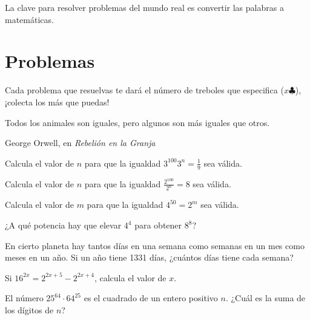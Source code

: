 \begin{moral}
    La clave para resolver problemas del mundo real 
    es convertir las palabras a matemáticas.
\end{moral}

\newpage

\section{Problemas}

Cada problema que resuelvas te dará el número de treboles 
que especifica ($x \clubsuit$), ¡colecta los más que puedas!

\epigraph{Todos los animales son iguales, pero algunos son 
más iguales que otros.}
{George Orwell, en \emph{Rebelión en la Granja}}

\begin{problem}[$1 \clubsuit$]
    Calcula el valor de \( n \) para que la igualdad 
    \( 3^{100} 3^n = \frac{1}{9} \) sea válida.
\end{problem}

\begin{problem}[$1 \clubsuit$]
    Calcula el valor de \( n \) para que la igualdad 
    \( \frac{2^{100}}{2^n} = 8 \) sea válida.
\end{problem}

\begin{problem}[$1 \clubsuit$]
    Calcula el valor de \( m \) para que la igualdad 
    \( 4^{50} = 2^m \) sea válida.
\end{problem}

\begin{problem}[$1 \clubsuit$]
    ¿A qué potencia hay que elevar \( 4^4 \) para 
    obtener \( 8^8 \)?    
\end{problem}

\begin{problem}[$2 \clubsuit$]
    En cierto planeta hay tantos días en una semana como 
    semanas en un mes como meses en un año. Si un año tiene 
    1331 días, ¿cuántos días tiene cada semana?
\end{problem}

\begin{problem}[$2 \clubsuit$]
    Si \( 16^{2x} = 2^{2x+5} - 2^{2x+4} \), calcula el 
    valor de \( x \).
\end{problem}

\begin{problem}[$2 \clubsuit$]
    El número \( 25^{64} \cdot 64^{25} \) es el cuadrado de un 
    entero positivo \( n \). ¿Cuál es la suma de los dígitos de 
    \( n \)?
\end{problem}

